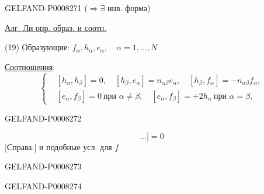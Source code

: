 \begin{GelfandAdjacentEvidence}{GELFAND-P000827}{1}
(\(\Rightarrow\exists\) инв. форма)

\uline{Алг. Ли опр. образ. и соотн.}

(19) Образующие: \(f_\alpha,h_\alpha,e_\alpha,\quad\alpha=1,\ldots,N\)

\uline{Соотношения}:
\begin{equation*}
\left\{\begin{aligned}
 &[h_\alpha,h_\beta]=0,\quad
   [h_\beta,e_\alpha]=n_{\alpha\beta}e_\alpha,\quad
   [h_\beta,f_\alpha]=-n_{\alpha\beta}f_\alpha,\\
 &[e_\alpha,f_\beta]=0\ \text{при }\alpha\ne\beta,\quad
   [e_\alpha,f_\beta]=+2h_\alpha\ \text{при }\alpha=\beta,
\end{aligned}\right.\tag{20}
\end{equation*}
\end{GelfandAdjacentEvidence}
\begin{GelfandAdjacentEvidence}{GELFAND-P000827}{2}


\begin{equation*}
[\underbrace{e_\alpha\ldots e_\alpha[e_\alpha}_{-n_{\alpha\beta}+1\ \text{раз.}},e_\beta]\ldots]=0
\tag*{\((20)'\)}
\end{equation*}
[Справа:] и подобные усл. для \(f\)
\end{GelfandAdjacentEvidence}
\begin{GelfandAdjacentEvidence}{GELFAND-P000827}{3}


\end{GelfandAdjacentEvidence}
\begin{GelfandAdjacentEvidence}{GELFAND-P000827}{4}


\end{GelfandAdjacentEvidence}
